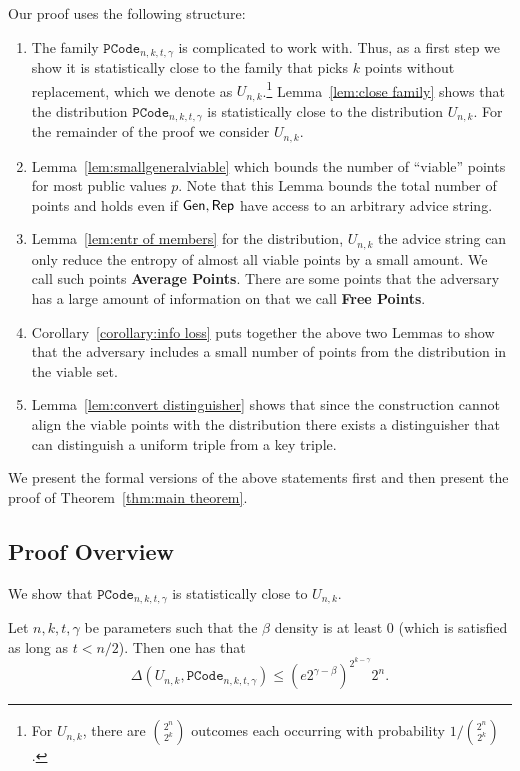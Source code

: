 Our proof uses the following structure:
\begin{enumerate}

\item The family $\mathtt{PCode}_{n, k, t, \gamma}$ is complicated to work with.  Thus, as a first step we show it is statistically close to the family that picks $k$ points without replacement, which we denote as $U_{n,k}$.\footnote{For $U_{n,k}$, there are ${2^{n}\choose 2^k}$ outcomes each occurring with probability $1/{2^{n}\choose 2^k}$.}  Lemma~\ref{lem:close family} shows that the distribution $\mathtt{PCode}_{n, k, t, \gamma}$ is statistically close to the distribution $U_{n,k}$.  For the remainder of the proof we consider $U_{n,k}$.
\item Lemma~\ref{lem:smallgeneralviable} which bounds the number of ``viable'' points for most public values $p$.  Note that this Lemma bounds the total number of points and holds even if ${\mathsf{Gen}}, {\mathsf{Rep}}$ have access to an arbitrary advice string. 

\item Lemma~\ref{lem:entr of members} for the distribution, $U_{n,k}$ the advice string can only reduce the entropy of almost all viable points by a small amount. We call such points \textbf{Average Points}.  There are some points that the adversary has a large amount of information on that we call \textbf{Free Points}.

\item Corollary~\ref{corollary:info loss} puts together the above two Lemmas to show that the adversary includes a small number of points from the distribution in the viable set.

\item Lemma~\ref{lem:convert distinguisher} shows that since the construction cannot align the viable points with the distribution there exists a distinguisher that can distinguish a uniform triple from a key triple. 
\end{enumerate}

\noindent
We present the formal versions of the above statements first and then present the proof of Theorem~\ref{thm:main theorem}.

\subsection{Proof Overview}
We show that $\mathtt{PCode}_{n, k, t, \gamma}$ is statistically close to $U_{n,k}$.

\begin{lemma}
 \label{lem:close family}
Let $n, k, t, \gamma$ be parameters such that the $\beta$ density is at least $0$ (which is satisfied as long as $t< n/2 $). Then one has that 
\[\Delta(U_{n,k}, \mathtt{PCode}_{n, k, t, \gamma}) \le \left(e2^{\gamma-\beta}\right)^{2^{k-\gamma}}2^n.\]
\end{lemma}

